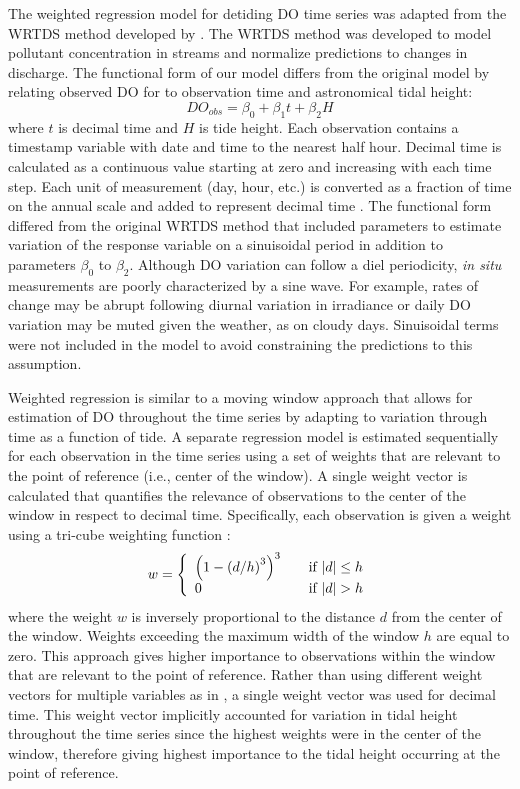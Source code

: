 \documentclass[letterpaper,12pt,oneside]{article}\usepackage[]{graphicx}\usepackage[]{color}
\begin{document}
The weighted regression model for detiding \ac{DO} time series was adapted from the \ac{WRTDS} method developed by \citet{Hirsch10}.  The \ac{WRTDS} method was developed to model pollutant concentration in streams and normalize predictions to changes in discharge.  The functional form of our model differs from the original model by relating observed \ac{DO} for to observation time and astronomical tidal height:
\begin{equation}\label{funform}
DO_{obs}= \beta_0 + \beta_1 t + \beta_2 H
\end{equation}
where $t$ is decimal time and $H$ is tide height. Each observation contains a timestamp variable with date and time to the nearest half hour.  Decimal time  is calculated as a continuous value starting at zero and increasing with each time step.  Each unit of measurement (day, hour, etc.) is converted as a fraction of time on the annual scale and added to represent decimal time \citep{Hirsch10}.  The functional form differed from the original \ac{WRTDS} method that included parameters to estimate variation of the response variable on a sinuisoidal period in addition to parameters $\beta_0$ to $\beta_2$.  Although \ac{DO} variation can follow a diel periodicity, \textit{in situ} measurements are poorly characterized by a sine wave.  For example, rates of change may be abrupt following diurnal variation in irradiance or daily \ac{DO} variation may be muted given the weather, as on cloudy days.  Sinuisoidal terms were not included in the model to avoid constraining the predictions to this assumption. 

Weighted regression is similar to a moving window approach that allows for estimation of \ac{DO} throughout the time series by adapting to variation through time as a function of tide. A separate regression model is estimated sequentially for each observation in the time series using a set of weights that are relevant to the point of reference (i.e., center of the window).  A single weight vector is calculated that quantifies the relevance of observations to the center of the window in respect to decimal time.  Specifically,  each observation is given a weight using a tri-cube weighting function \citep{Hirsch10}:
\begin{equation}
w= \left\{ 
  \begin{array}{l l}
    \left(1-\left(d/h\right)^3\right)^3 & \quad \textrm{if } |d| \leq h \\
    0 & \quad \textrm{if } |d| > h 
  \end{array} \right.
\end{equation}
where the weight $w$ is inversely proportional to the distance $d$ from the center of the window.  Weights exceeding the maximum width of the window $h$ are equal to zero.  This approach gives higher importance to observations within the window that are relevant to the point of reference.  Rather than using different weight vectors for multiple variables as in \cite{Hirsch10}, a single weight vector was used for decimal time.  This weight vector implicitly accounted for variation in tidal height throughout the time series since the highest weights were in the center of the window, therefore giving highest importance to the tidal height occurring at the point of reference. 
\end{document}
